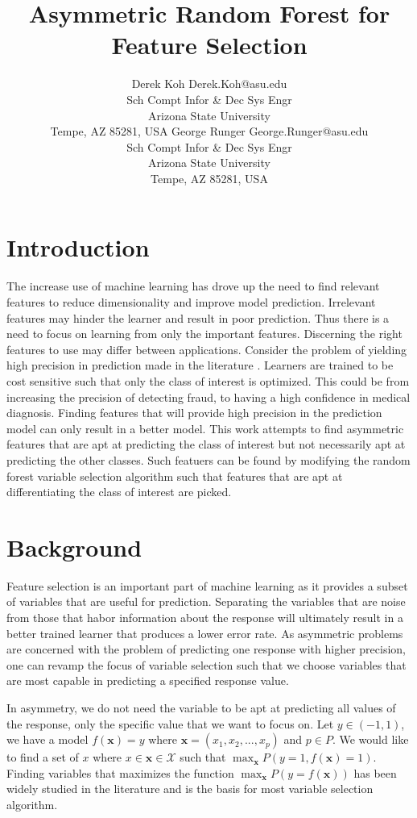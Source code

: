 \documentclass[twoside,11pt]{article}
\title{Asymmetric Random Forest for Feature Selection}
\author{\name Derek Koh \email Derek.Koh@asu.edu \\
       \addr Sch Compt Infor \& Dec Sys Engr\\
       Arizona State University\\
       Tempe, AZ 85281, USA
       \AND
\name George Runger \email George.Runger@asu.edu\\
       \addr Sch Compt Infor \& Dec Sys Engr\\
       Arizona State University\\
       Tempe, AZ 85281, USA
}
\begin{document}
\maketitle

\section{Introduction}
The increase use of machine learning has drove up the need to find relevant features to reduce dimensionality and improve model prediction. Irrelevant features may hinder the learner and result in poor prediction. Thus there is a need to focus on learning from only the important features. Discerning the right features to use may differ between applications. Consider the problem of yielding high precision in prediction made in the literature \citep{Masnadi11}. Learners are trained to be cost sensitive such that only the class of interest is optimized. This could be from increasing the precision of detecting fraud, to having a high confidence in medical diagnosis. Finding features that will provide high precision in the prediction model can only result in a better model. This work attempts to find asymmetric features that are apt at predicting the class of interest but not necessarily apt at predicting the other classes. Such featuers can be found by modifying the random forest variable selection algorithm such that features that are apt at differentiating the class of interest are picked. 

\section{Background}
Feature selection is an important part of machine learning as it provides a subset of variables that are useful for prediction. Separating the variables that are noise from those that habor information about the response will ultimately result in a better trained learner that produces a lower error rate. As asymmetric problems are concerned with the problem of predicting one response with higher precision, one can revamp the focus of variable selection such that we choose variables that are most capable in predicting a specified response value.

In asymmetry, we do not need the variable to be apt at predicting all values of the response, only the specific value that we want to focus on. Let $y \in (-1,1)$, we have a model $f(\mathbf{x})=y$ where $\mathbf{x} = (x_1,x_2,...,x_p)$ and $p \in P$. We would like to find a set of $x$ where $x \in \mathbf{x} \in \mathcal{X}$ such that $\displaystyle\max_{\mathbf{x}}P(y=1,f(\mathbf{x})=1)$. Finding variables that maximizes the function $\displaystyle\max_{\mathbf{x}}P(y=f(\mathbf{x}))$ has been widely studied in the literature and is the basis for most variable selection algorithm. 
\end{document}
